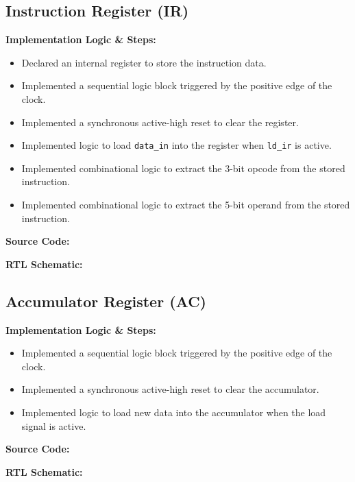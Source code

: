 \subsection{Instruction Register (IR)}
\textbf{Implementation Logic \& Steps:}
\begin{itemize}
	\item Declared an internal register to store the instruction data.
	\item Implemented a sequential logic block triggered by the positive edge of the clock.
	\item Implemented a synchronous active-high reset to clear the register.
	\item Implemented logic to load \texttt{data\_in} into the register when \texttt{ld\_ir} is active.
	\item Implemented combinational logic to extract the 3-bit opcode from the stored instruction.
	\item Implemented combinational logic to extract the 5-bit operand from the stored instruction.
\end{itemize}

\textbf{Source Code:}

\textbf{RTL Schematic:}

\subsection{Accumulator Register (AC)}
\textbf{Implementation Logic \& Steps:}
\begin{itemize}
	\item Implemented a sequential logic block triggered by the positive edge of the clock.
	\item Implemented a synchronous active-high reset to clear the accumulator.
	\item Implemented logic to load new data into the accumulator when the load signal is active.
\end{itemize}

\textbf{Source Code:}

\textbf{RTL Schematic:}

